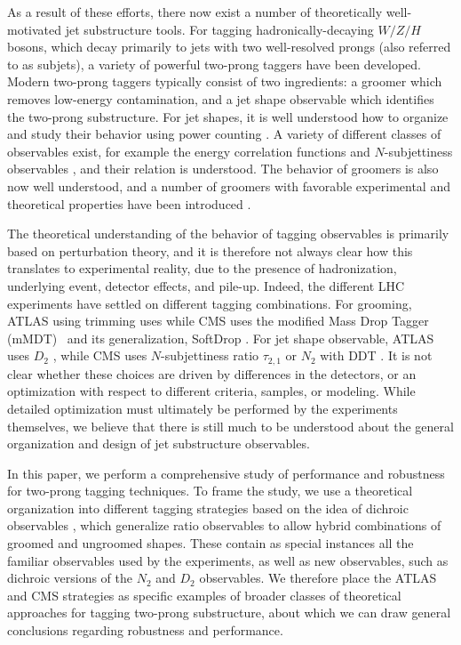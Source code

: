 \documentclass[11pt,letterpaper]{article}
\begin{document}
As a result of these efforts, there now exist a number of theoretically well-motivated jet substructure tools.
%
For tagging hadronically-decaying $W/Z/H$ bosons, which decay primarily to jets with two well-resolved prongs (also referred to as subjets), a variety of powerful two-prong taggers have been developed.
%
Modern two-prong taggers typically consist of two ingredients: a groomer which removes low-energy contamination, and a jet shape observable which identifies the two-prong substructure.
%
For jet shapes, it is well understood how to organize and study their
behavior using power counting \cite{Larkoski:2014gra}.
%
A variety of
different classes of observables exist, for example the energy
correlation functions \cite{Larkoski:2013eya,Moult:2016cvt,Komiske:2017aww} and $N$-subjettiness
observables \cite{Thaler:2010tr,Thaler:2011gf}, and their relation is
understood.
%
The behavior of groomers is also now well understood, and
a number of groomers with favorable experimental and theoretical properties have been introduced
\cite{Dasgupta:2013ihk,Larkoski:2014wba}.

The
theoretical understanding of the behavior of tagging observables is primarily based on perturbation theory, and it is therefore
not always clear how this translates to experimental reality, due to
the presence of hadronization, underlying event, detector effects, and
pile-up.
%
Indeed, the different LHC experiments have settled on different
tagging combinations.
%
For grooming, ATLAS using trimming \cite{Krohn:2009th} uses while CMS uses the modified
  Mass Drop Tagger (mMDT)~\cite{Dasgupta:2013ihk} and its generalization, SoftDrop \cite{Larkoski:2014wba}.
  For jet shape observable, ATLAS uses $D_2$ \cite{Larkoski:2014gra,Larkoski:2015kga}, while CMS uses $N$-subjettiness ratio $\tau_{2,1}$ \cite{Thaler:2010tr,Thaler:2011gf} or $N_2$ \cite{Moult:2016cvt} with DDT \cite{Dolen:2016kst}.
  It is not clear whether these choices are driven by differences in the detectors, or an optimization with respect to different criteria, samples, or modeling. While detailed optimization must ultimately be performed by the experiments themselves, we believe that there is still much to be understood about the general organization and design of jet substructure observables.

In this paper, we perform a comprehensive study of performance and robustness for two-prong tagging techniques.
%
To frame the study, we use a theoretical organization into different tagging strategies based on the idea of dichroic observables \cite{Salam:2016yht}, which generalize ratio observables to allow hybrid combinations of groomed and ungroomed shapes.
 These contain as special instances all the familiar observables used by the experiments, as well as new observables, such as dichroic versions of the $N_2$ and $D_2$ observables.
 We therefore place the ATLAS and CMS strategies as specific examples of broader classes of theoretical approaches for tagging two-prong substructure, about which we can draw general conclusions regarding robustness and performance.
\end{document}
